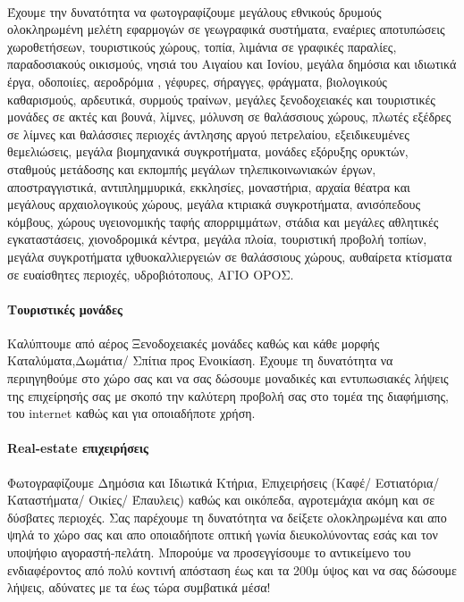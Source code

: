 \documentclass[a4paper, 12pt, twoside]{report}
\begin{document}
			\paragraph{}{Έχουμε την δυνατότητα να φωτογραφίζουμε μεγάλους εθνικούς δρυμούς ολοκληρωμένη μελέτη εφαρμογών σε γεωγραφικά συστήματα, εναέριες αποτυπώσεις χωροθετήσεων, τουριστικούς χώρους, τοπία, λιμάνια σε γραφικές παραλίες, παραδοσιακούς οικισμούς, νησιά του Αιγαίου και Ιονίου, μεγάλα δημόσια και ιδιωτικά έργα, οδοποιίες, αεροδρόμια , γέφυρες, σήραγγες, φράγματα, βιολογικούς καθαρισμούς, αρδευτικά, συρμούς τραίνων, μεγάλες ξενοδοχειακές και τουριστικές μονάδες σε ακτές και βουνά, λίμνες, μόλυνση σε θαλάσσιους χώρους, πλωτές εξέδρες σε λίμνες και θαλάσσιες περιοχές άντλησης αργού πετρελαίου, εξειδικευμένες θεμελιώσεις, μεγάλα βιομηχανικά συγκροτήματα,  μονάδες εξόρυξης ορυκτών, σταθμούς μετάδοσης και εκπομπής μεγάλων  τηλεπικοινωνιακών έργων, αποστραγγιστικά, αντιπλημμυρικά, εκκλησίες, μοναστήρια, αρχαία θέατρα και μεγάλους αρχαιολογικούς χώρους, μεγάλα κτιριακά συγκροτήματα, ανισόπεδους κόμβους, χώρους υγειονομικής ταφής απορριμμάτων, στάδια και μεγάλες αθλητικές εγκαταστάσεις, χιονοδρομικά κέντρα, μεγάλα πλοία, τουριστική προβολή τοπίων, μεγάλα συγκροτήματα ιχθυοκαλλιεργειών σε θαλάσσιους χώρους, αυθαίρετα κτίσματα σε ευαίσθητες περιοχές, υδροβιότοπους, ΑΓΙΟ ΟΡΟΣ.
			}
			
			\paragraph{Τουριστικές μονάδες}{Καλύπτουμε από αέρος Ξενοδοχειακές μονάδες καθώς και κάθε μορφής Kαταλύματα,Δωμάτια/ Σπίτια προς Ενοικίαση.
Έχουμε τη δυνατότητα να περιηγηθούμε στο χώρο σας και να σας δώσουμε μοναδικές και εντυπωσιακές λήψεις της επιχείρησής σας με σκοπό την καλύτερη προβολή σας στο τομέα της διαφήμισης, του internet καθώς και για οποιαδήποτε χρήση.
			}
			\paragraph{Real-estate επιχειρήσεις}{Φωτογραφίζουμε Δημόσια και Ιδιωτικά Κτήρια, Επιχειρήσεις (Καφέ/ Εστιατόρια/ Καταστήματα/ Οικίες/ Έπαυλεις) καθώς και οικόπεδα, αγροτεμάχια ακόμη και σε δύσβατες περιοχές. Σας παρέχουμε τη δυνατότητα να δείξετε ολοκληρωμένα και απο ψηλά το χώρο σας και απο οποιαδήποτε οπτική γωνία διευκολύνοντας εσάς και τον υποψήφιο αγοραστή-πελάτη. Μπορούμε να προσεγγίσουμε το αντικείμενο του ενδιαφέροντος από πολύ κοντινή απόσταση έως και τα 200μ ύψος και να σας δώσουμε λήψεις, αδύνατες με τα έως τώρα συμβατικά μέσα! 
			}
\end{document}
